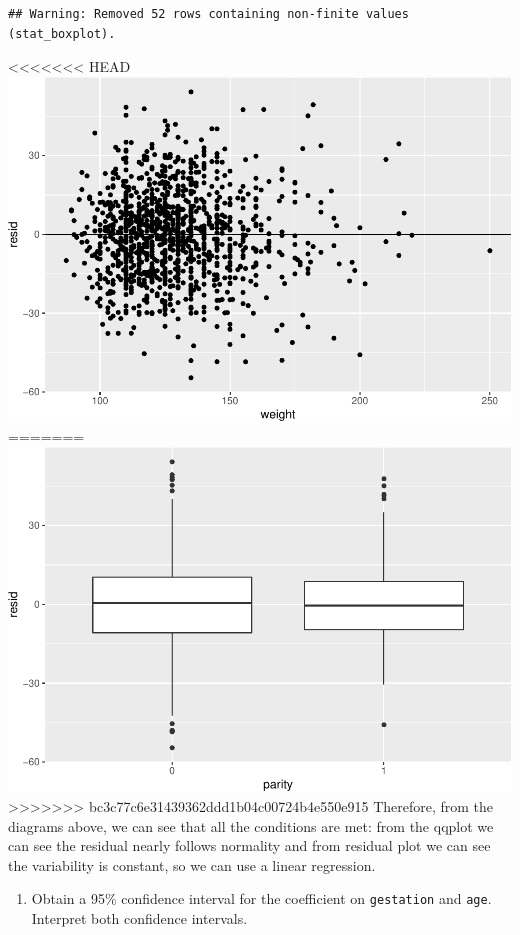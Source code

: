 \documentclass[]{article}
\providecommand{\tightlist}{%
  \setlength{\itemsep}{0pt}\setlength{\parskip}{0pt}}
\begin{document}
\begin{verbatim}
## Warning: Removed 52 rows containing non-finite values (stat_boxplot).
\end{verbatim}

<<<<<<< HEAD
\includegraphics{lab-8-regression_files/figure-latex/unnamed-chunk-22-1.pdf}
=======
\includegraphics{lab-8-regression_files/figure-latex/unnamed-chunk-23-1.pdf}
>>>>>>> bc3c77c6e31439362ddd1b04c00724b4e550e915
Therefore, from the diagrams above, we can see that all the conditions
are met: from the qqplot we can see the residual nearly follows
normality and from residual plot we can see the variability is constant,
so we can use a linear regression.

\newpage

\begin{enumerate}
\def\labelenumi{\arabic{enumi}.}
\setcounter{enumi}{7}
\tightlist
\item
  Obtain a 95\% confidence interval for the coefficient on
  \texttt{gestation} and \texttt{age}. Interpret both confidence
  intervals.
\end{enumerate}
\end{document}
